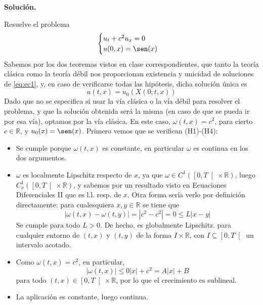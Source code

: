\documentclass[12pt]{article}
\newcommand{\R}{\mathbb{R}}
\begin{document}
    \newpage
    \setcounter{ejercicio}{0} %
    \noindent
    \textbf{Solución.}

    \begin{ejercicio}
        Resuelve el problema
        \begin{equation}\label{eq:ec1}
            \begin{cases}
                u_t + c^2u_x = 0 \\
                u(0,x) = \sen(x)
            \end{cases}
        \end{equation}
        Sabemos por los dos teoremas vistos en clase correspondientes, que tanto la teoría clásica como la teoría débil nos proporcionan existencia y unicidad de soluciones de \eqref{eq:ec1}, y, en caso de verificarse todas las hipótesis, dicha solución única es
        $$u(t,x) = u_0(X(0;t,x))$$
        Dado que no se especifica si usar la vía clásica o la vía débil para resolver el problema, y que la solución obtenida será la misma (en caso de que se pueda ir por esa vía), optamos por la vía clásica. En este caso, $\omega(t,x) = c^2$, para cierto $c \in \R$, y $u_0(x) = \sen(x)$. Primero vemos que se verifican (H1)-(H4):
        \begin{itemize}
            \item[(H1)] Se cumple porque $\omega(t,x)$ es constante, en particular $\omega$ es continua en los dos argumentos.
            \item[(H2)] $\omega$ es localmente Lipschitz respecto de $x$, ya que $\omega \in C^1(\left[0,T \right[ \times \R)$, luego $C^1_x(\left[0,T \right[ \times \R)$, y sabemos por un resultado visto en Ecuaciones Diferenciales II que es l.l. resp. de $x$.
            Otra forma sería verlo por definición directamente: para cualesquiera $x,y \in \R$ se tiene que
            $$|\omega(t,x) - \omega(t,y)| = |c^2-c^2| = 0 \leq L|x-y|$$
            Se cumple para todo $L>0$. De hecho, es globalmente Lipschitz.
            para cualquier entorno de $(t,x)$ y $(t,y)$ de la forma $I \times \R$, con $I \subseteq \left[0,T \right[$ un intervalo acotado. 
            \item[(H3)] Como $\omega(t,x) = c^2$, en particular, $$|\omega(t,x)| \leq 0|x| + c^2 = A|x| + B$$
            para todo $(t,x) \in \left[0, T \right[ \times \R$, por lo que el crecimiento es sublineal.
            \item[(H4)] La aplicación \Func{\dfrac{\partial \omega}{\partial x}}{\left[0, T \right[ \times \R}{\R}{(t,x)}{\dfrac{\partial \omega}{\partial x}(t,x) = 0} es constante, luego continua.

\end{itemize}
\end{ejercicio}
\end{document}
